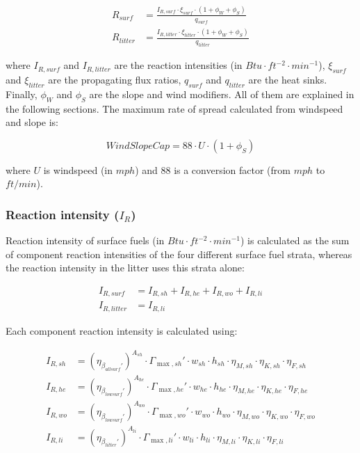 \documentclass[]{book}
\begin{document}
\begin{eqnarray} 
R_{surf} &= \frac{I_{R,surf} \cdot \xi_{surf}\cdot (1 + \phi_W + \phi_S)}{q_{surf}}\\
R_{litter} &= \frac{I_{R,litter} \cdot \xi_{litter}\cdot (1 + \phi_W + \phi_S)}{q_{litter}}
\end{eqnarray}

where \(I_{R,surf}\) and \(I_{R,litter}\) are the reaction intensities
(in \(Btu \cdot ft^{-2} \cdot min^{-1}\)), \(\xi_{surf}\) and
\(\xi_{litter}\) are the propagating flux ratios, \(q_{surf}\) and
\(q_{litter}\) are the heat sinks. Finally, \(\phi_W\) and \(\phi_S\)
are the slope and wind modifiers. All of them are explained in the
following sections. The maximum rate of spread calculated from windspeed
and slope is:

\begin{equation}
WindSlopeCap = 88 \cdot U \cdot (1 + \phi_S)
\end{equation}

where \(U\) is windspeed (in \(mph\)) and \(88\) is a conversion factor
(from \(mph\) to \(ft/min\)).

\subsubsection{\texorpdfstring{Reaction intensity
(\(I_R\))}{Reaction intensity (I\_R)}}\label{reaction-intensity-i_r}

Reaction intensity of surface fuels (in
\(Btu \cdot ft^{-2} \cdot min^{-1}\)) is calculated as the sum of
component reaction intensities of the four different surface fuel
strata, whereas the reaction intensity in the litter uses this strata
alone:

\begin{eqnarray} 
I_{R,surf} &= I_{R, sh} + I_{R, he}+ I_{R, wo}+I_{R, li}\\
I_{R,litter} &= I_{R, li}
\label{eq:reactintensity}
\end{eqnarray}

Each component reaction intensity is calculated using:

\begin{eqnarray} 
I_{R,sh} &= (\eta_{\beta_{allsurf}'})^{A_{sh}}\cdot \Gamma_{\max, sh}'\cdot w_{sh} \cdot h_{sh} \cdot \eta_{M,sh}\cdot \eta_{K,sh}\cdot \eta_{F,sh}\\
I_{R,he} &= (\eta_{\beta_{lowsurf}'})^{A_{he}}\cdot \Gamma_{\max, he}'\cdot w_{he} \cdot h_{he} \cdot \eta_{M,he}\cdot \eta_{K,he}\cdot \eta_{F,he}\\
I_{R,wo} &= (\eta_{\beta_{lowsurf}'})^{A_{wo}}\cdot \Gamma_{\max, wo}'\cdot w_{wo} \cdot h_{wo} \cdot \eta_{M,wo}\cdot \eta_{K,wo}\cdot \eta_{F,wo}\\
I_{R,li} &= (\eta_{\beta_{litter}'})^{A_{li}}\cdot \Gamma_{\max, li}'\cdot w_{li} \cdot h_{li} \cdot \eta_{M,li}\cdot \eta_{K,li}\cdot \eta_{F,li}
\label{eq:reactintensitycomp}
\end{eqnarray}
\end{document}
